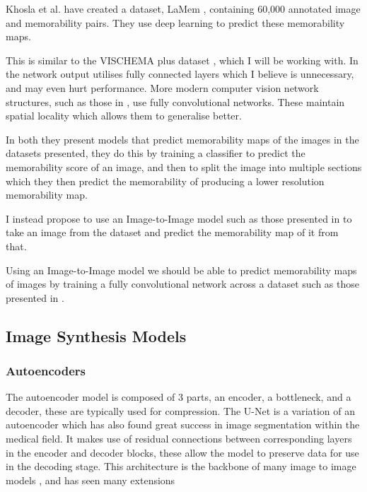 \documentclass{UoYCSproject}
\begin{document}
Khosla et al. have created a dataset, LaMem \cite{ICCV15_Khosla}, containing 60,000 annotated image and memorability pairs. They use deep learning to predict these memorability maps.

This is similar to the VISCHEMA plus dataset \cite{VischemaPaper}, which I will be working with. In \cite{VischemaPaper} the network output utilises fully connected layers which I believe is unnecessary, and may even hurt performance. More modern computer vision network structures, such as those in \cite{ronneberger2015unet, goodfellow2014generative, ho2020denoising, isola2018imagetoimage, saharia2022palette}, use fully convolutional networks. These maintain spatial locality which allows them to generalise better.

In both \cite{VischemaPaper, ICCV15_Khosla} they present models that predict memorability maps of the images in the datasets presented, they do this by training a classifier to predict the memorability score of an image, and then to split the image into multiple sections which they then predict the memorability of producing a lower resolution memorability map. 

I instead propose to use an Image-to-Image model such as those presented in \cite{ronneberger2015unet, isola2018imagetoimage, ho2020denoising} to take an image from the dataset and predict the memorability map of it from that.

Using an Image-to-Image model we should be able to predict memorability maps of images by training a fully convolutional network across a dataset such as those presented in \cite{VischemaPaper, ICCV15_Khosla}.

\subsection{Image Synthesis Models}

\subsubsection{Autoencoders}

The autoencoder model is composed of 3 parts, an encoder, a bottleneck, and a decoder, these are typically used for compression. The U-Net \cite{ronneberger2015unet} is a variation of an autoencoder which has also found great success in image segmentation within the medical field. It makes use of residual connections between corresponding layers in the encoder and decoder blocks, these allow the model to preserve data for use in the decoding stage. This architecture is the backbone of many image to image models \cite{isola2018imagetoimage,saharia2022palette,dhariwal2021diffusion}, and has seen many extensions \cite{zhou2020unet, Qin_2020}
\end{document}
